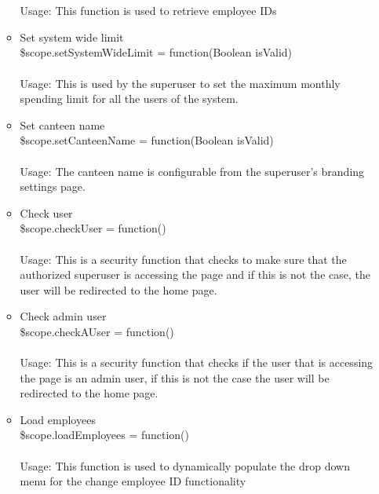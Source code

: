 \documentclass[a4paper,12pt]{report}
\begin{document}
\begin{enumerate}
\begin{itemize}
		\\ \\ Usage: This function is used to retrieve employee IDs 
		\item Set system wide limit \\ \$scope.setSystemWideLimit = function(Boolean isValid)\\ \\ Usage: This is used by the superuser to set the maximum monthly spending limit for all the users of the system.
		 \item Set canteen name \\ \$scope.setCanteenName = function(Boolean isValid) 
		\\ \\ Usage: The canteen name is configurable from the superuser's branding settings page.
		\item Check user \\ \$scope.checkUser = function() 
		\\ \\Usage: This is a security function that checks to make sure that the authorized superuser is accessing the page and if this is not the case, the user will be redirected to the home page.
		\item Check admin user\\
		\$scope.checkAUser = function()
		\\ \\Usage: This is a security function that checks if the user that is accessing the page is an admin user, if this is not the case the user will be redirected to the home page.
		\item Load employees \\ \$scope.loadEmployees = function() 
		\\ \\Usage: This function is used to dynamically populate the drop down menu for the change employee ID functionality
	\end{itemize}
\end{enumerate} 
\end{document}
